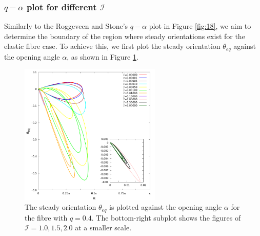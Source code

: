 \documentclass[lineno]{JFM-FLM_Au}
\begin{document}
\subsubsection{$q-\alpha$ plot for different $\mathcal{I}$}
 Similarly to the Roggeveen and Stone's $q-\alpha$ plot in Figure \ref{fig:18}, we aim to determine the boundary of the region where steady orientations exist for the elastic fibre case. To achieve this, we first plot the steady orientation $\theta_{eq}$ against the opening angle $\alpha$, as shown in Figure \ref{fig:14}. 
 \begin{figure}[!h]
	\begin{center}
		\includegraphics[width=0.6\textwidth]{plot/elastic_beam_alpha_theta_eq_q_0.400.png}
		\caption{The steady orientation $\theta_{eq}$ is plotted against  the opening angle $\alpha$ for the fibre with $q = 0.4$. The bottom-right subplot shows the figures of $\mathcal{I}=1.0, 1.5, 2.0$ at a smaller scale.}
		\label{fig:14}
	\end{center}
\end{figure}
\end{document}
